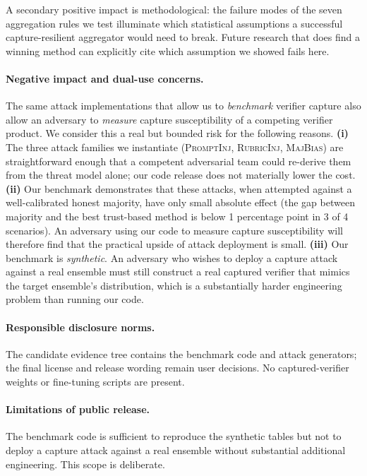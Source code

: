 \documentclass[11pt]{article}
\begin{document}
A secondary positive impact is methodological: the failure modes of
the seven aggregation rules we test illuminate which statistical
assumptions a successful capture-resilient aggregator would need
to break. Future research that does find a winning method can
explicitly cite which assumption we showed fails here.

\paragraph{Negative impact and dual-use concerns.}
The same attack implementations that allow us to \emph{benchmark}
verifier capture also allow an adversary to \emph{measure} capture
susceptibility of a competing verifier product. We consider this a
real but bounded risk for the following reasons.
\textbf{(i)} The three attack families we instantiate
(\textsc{PromptInj}, \textsc{RubricInj}, \textsc{MajBias}) are
straightforward enough that a competent adversarial team could
re-derive them from the threat model alone; our code release does
not materially lower the cost.
\textbf{(ii)} Our benchmark demonstrates that these attacks, when
attempted against a well-calibrated honest majority, have only
small absolute effect (the gap between majority and the best
trust-based method is below 1 percentage point in 3 of 4
scenarios). An adversary using our code to measure capture
susceptibility will therefore find that the practical upside of
attack deployment is small.
\textbf{(iii)} Our benchmark is \emph{synthetic}. An adversary who
wishes to deploy a capture attack against a real ensemble must
still construct a real captured verifier that mimics the target
ensemble's distribution, which is a substantially harder engineering
problem than running our code.

\paragraph{Responsible disclosure norms.}
The candidate evidence tree contains the benchmark code and attack
generators; the final license and release wording remain user decisions.
No captured-verifier weights or fine-tuning scripts are present.

\paragraph{Limitations of public release.}
The benchmark code is sufficient to reproduce the synthetic tables but not
to deploy a capture attack against a real ensemble without substantial
additional engineering. This scope is deliberate.
\end{document}
